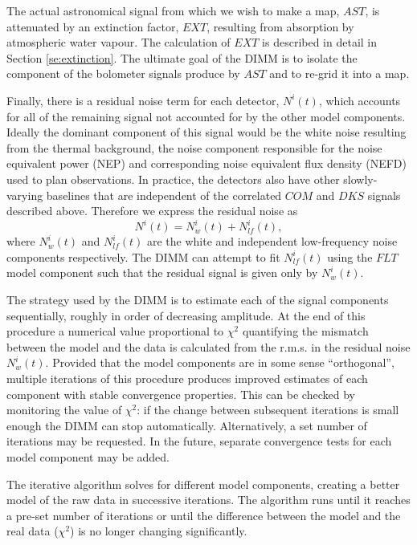 \documentclass[twoside,11pt]{article}
\renewcommand{\_}{\texttt{\symbol{95}}}
\begin{document}
The actual astronomical signal from which we wish to make a map,
$AST$, is attenuated by an extinction factor, $EXT$, resulting from
absorption by atmospheric water vapour. The calculation of $EXT$ is
described in detail in Section \ref{se:extinction}. The ultimate goal
of the DIMM is to isolate the component of the bolometer signals
produce by $AST$ and to re-grid it into a map.

Finally, there is a residual noise term for each detector, $N^i(t)$,
which accounts for all of the remaining signal not accounted for by
the other model components. Ideally the dominant component of this
signal would be the white noise resulting from the thermal background,
the noise component responsible for the noise equivalent power (NEP)
and corresponding noise equivalent flux density (NEFD) used to plan
observations. In practice, the detectors also have other
slowly-varying baselines that are independent of the correlated $COM$
and $DKS$ signals described above. Therefore we express the residual
noise as
%
\begin{equation}
N^i(t) = N^i_w(t) + N^i_{lf}(t),
\label{eq:dimm_noise}
\end{equation}
%
where $N^i_w(t)$ and $N^i_{lf}(t)$ are the white and independent
low-frequency noise components respectively. The DIMM can attempt to
fit $N^i_{lf}(t)$ using the $FLT$ model component such that the
residual signal is given only by $N^i_w(t)$.

The strategy used by the DIMM is to estimate each of the signal
components sequentially, roughly in order of decreasing amplitude. At
the end of this procedure a numerical value proportional to $\chi^2$
quantifying the mismatch between the model and the data is calculated
from the r.m.s. in the residual noise $N^i_w(t)$. Provided that the
model components are in some sense ``orthogonal'', multiple iterations
of this procedure produces improved estimates of each component with
stable convergence properties. This can be checked by monitoring the
value of $\chi^2$: if the change between subsequent iterations is
small enough the DIMM can stop automatically. Alternatively, a set
number of iterations may be requested. In the future, separate
convergence tests for each model component may be added.

The iterative algorithm solves for different model components,
creating a better model of the raw data in successive iterations. The
algorithm runs until it reaches a pre-set number of iterations or
until the difference between the model and the real data ($\chi^2$) is
no longer changing significantly.
\end{document}
